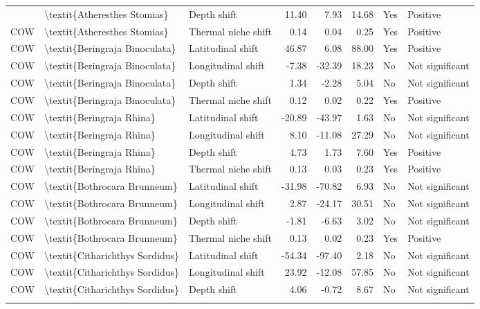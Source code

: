 \begin{longtable}[t]{lllrrrll}
{{COW & \textbackslash{}textit\{Atheresthes Stomias\} & Depth shift & 11.40 & 7.93 & 14.68 & Yes & Positive\\
\addlinespace
COW & \textbackslash{}textit\{Atheresthes Stomias\} & Thermal niche shift & 0.14 & 0.04 & 0.25 & Yes & Positive\\
COW & \textbackslash{}textit\{Beringraja Binoculata\} & Latitudinal shift & 46.87 & 6.08 & 88.00 & Yes & Positive\\
COW & \textbackslash{}textit\{Beringraja Binoculata\} & Longitudinal shift & -7.38 & -32.39 & 18.23 & No & Not significant\\
COW & \textbackslash{}textit\{Beringraja Binoculata\} & Depth shift & 1.34 & -2.28 & 5.04 & No & Not significant\\
COW & \textbackslash{}textit\{Beringraja Binoculata\} & Thermal niche shift & 0.12 & 0.02 & 0.22 & Yes & Positive\\
\addlinespace
COW & \textbackslash{}textit\{Beringraja Rhina\} & Latitudinal shift & -20.89 & -43.97 & 1.63 & No & Not significant\\
COW & \textbackslash{}textit\{Beringraja Rhina\} & Longitudinal shift & 8.10 & -11.08 & 27.29 & No & Not significant\\
COW & \textbackslash{}textit\{Beringraja Rhina\} & Depth shift & 4.73 & 1.73 & 7.60 & Yes & Positive\\
COW & \textbackslash{}textit\{Beringraja Rhina\} & Thermal niche shift & 0.13 & 0.03 & 0.23 & Yes & Positive\\
COW & \textbackslash{}textit\{Bothrocara Brunneum\} & Latitudinal shift & -31.98 & -70.82 & 6.93 & No & Not significant\\
\addlinespace
COW & \textbackslash{}textit\{Bothrocara Brunneum\} & Longitudinal shift & 2.87 & -24.17 & 30.51 & No & Not significant\\
COW & \textbackslash{}textit\{Bothrocara Brunneum\} & Depth shift & -1.81 & -6.63 & 3.02 & No & Not significant\\
COW & \textbackslash{}textit\{Bothrocara Brunneum\} & Thermal niche shift & 0.13 & 0.02 & 0.23 & Yes & Positive\\
COW & \textbackslash{}textit\{Citharichthys Sordidus\} & Latitudinal shift & -54.34 & -97.40 & 2.18 & No & Not significant\\
COW & \textbackslash{}textit\{Citharichthys Sordidus\} & Longitudinal shift & 23.92 & -12.08 & 57.85 & No & Not significant\\
\addlinespace
COW & \textbackslash{}textit\{Citharichthys Sordidus\} & Depth shift & 4.06 & -0.72 & 8.67 & No & Not significant\\
}}
\end{longtable}
